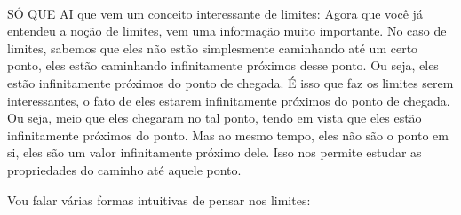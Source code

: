 \documentclass{article}
\begin{document}
\\[2pt]
SÓ QUE AI que vem um conceito interessante de limites: Agora que você já entendeu a noção de limites, vem uma informação muito importante. No caso de limites, sabemos que eles não estão simplesmente caminhando até um certo ponto, eles estão caminhando infinitamente próximos desse ponto. Ou seja, eles estão infinitamente próximos do ponto de chegada. É isso que faz os limites serem interessantes, o fato de eles estarem infinitamente próximos do ponto de chegada. Ou seja, meio que eles chegaram no tal ponto, tendo em vista que eles estão infinitamente próximos do ponto. Mas ao mesmo tempo, eles não são o ponto em si, eles são um valor infinitamente próximo dele. Isso nos permite estudar as propriedades do caminho até aquele ponto. 

Vou falar várias formas intuitivas de pensar nos limites:
\end{document}
